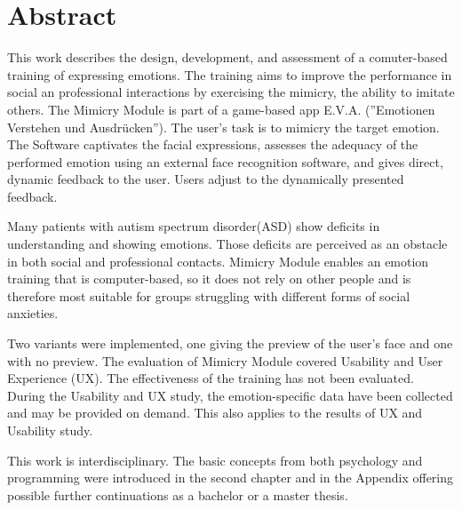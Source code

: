 \pagebreak
\thispagestyle{empty}
\section*{Abstract}
This work describes the design, development, and assessment of a comuter-based training of expressing emotions.
The training aims to improve the performance in social an professional interactions by exercising the mimicry, the ability to imitate others. 
The Mimicry Module is part of a game-based app E.V.A. (''Emotionen Verstehen und Ausdrücken''). 
The user's task is to mimicry the target emotion. The Software captivates the facial expressions, assesses the adequacy of the performed emotion using an external face recognition software, and gives direct, dynamic feedback to the user. Users adjust to the dynamically presented feedback.

Many patients with autism spectrum disorder(ASD) show deficits in understanding and showing emotions. Those deficits are perceived as an obstacle in both social and professional contacts. Mimicry Module enables an emotion training that is computer-based, so it does not rely on other people and is therefore most suitable for groups struggling with different forms of social anxieties. 

Two variants were implemented, one giving the preview of the user's face and one with no preview. The evaluation of Mimicry Module covered Usability and User Experience (UX). The effectiveness of the training has not been evaluated. 
During the Usability and UX study, the emotion-specific data have been collected and may be provided on demand. 
This also applies to the results of UX and Usability study. 

This work is interdisciplinary. The basic concepts from both psychology and programming were introduced in the second chapter and in the Appendix offering possible further continuations as a bachelor or a master thesis.
